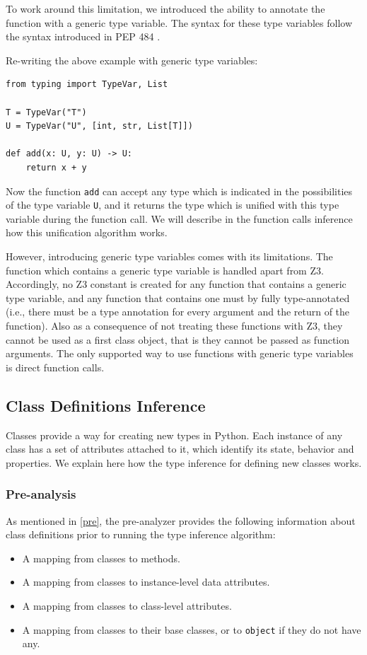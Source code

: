 To work around this limitation, we introduced the ability to annotate the function with a generic type variable. The syntax for these type variables follow the syntax introduced in PEP 484 \cite{484}.

Re-writing the above example with generic type variables:

\begin{lstlisting}
from typing import TypeVar, List

T = TypeVar("T")
U = TypeVar("U", [int, str, List[T]])

def add(x: U, y: U) -> U:
	return x + y
\end{lstlisting}
Now the function \lstinline|add| can accept any type which is indicated in the possibilities of the type variable \lstinline|U|, and it returns the type which is unified with this type variable during the function call. We will describe in the function calls inference how this unification algorithm works.

However, introducing generic type variables comes with its limitations. The function which contains a generic type variable is handled apart from Z3. Accordingly, no Z3 constant is created for any function that contains a generic type variable, and any function that contains one must by fully type-annotated (i.e., there must be a type annotation for every argument and the return of the function). Also as a consequence of not treating these functions with Z3, they cannot be used as a first class object, that is they cannot be passed as function arguments. The only supported way to use functions with generic type variables is direct function calls.
\subsection{Class Definitions Inference}
Classes provide a way for creating new types in Python. Each instance of any class has a set of attributes attached to it, which identify its state, behavior and properties. We explain here how the type inference for defining new classes works. \\

\subsubsection{Pre-analysis}
As mentioned in \ref{pre}, the pre-analyzer provides the following information about class definitions prior to running the type inference algorithm:

\begin{itemize}
	\item A mapping from classes to methods.
	\item A mapping from classes to instance-level data attributes.
	\item A mapping from classes to class-level attributes.
	\item A mapping from classes to their base classes, or to \lstinline|object| if they do not have any.
\end{itemize}


